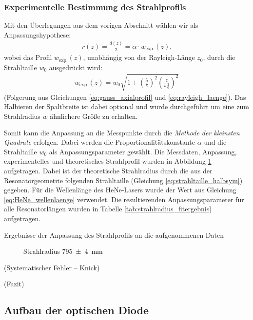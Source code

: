 \documentclass[11pt, a4paper]{article}
\numberwithin{equation}{section}
\begin{document}
\subsubsection{Experimentelle Bestimmung des Strahlprofils}
Mit den Überlegungen aus dem vorigen Abschnitt wählen wir als Anpassungshypothese:
\begin{align}
	 r(z) = \frac{d(z)}{2} = \alpha \cdot w_\mathrm{exp.}(z) \text{,}
\end{align}
wobei das Profil $w_\mathrm{exp.}(z)$, unabhängig von der Rayleigh-Länge $z_0$, durch die Strahltaille $w_0$ ausgedrückt wird:
\begin{align}
	w_\mathrm{exp.}(z) = w_0 \sqrt{1 + \left( \frac{\lambda}{\pi} \right)^2 \left( \frac{z}{w_0^2}\right)^2}
\end{align}
(Folgerung aus Gleichungen \ref{eq:gauss_axialprofil} und \ref{eq:rayleigh_laenge}).
Das Halbieren der Spaltbreite ist dabei optional und wurde durchgeführt um eine zum Strahlradius $w$ ähnlichere Größe zu erhalten.

Somit kann die Anpassung an die Messpunkte durch die \emph{Methode der kleinsten Quadrate} erfolgen.
Dabei werden die Proportionalitätskonstante $\alpha$ und die Strahltaille $w_0$ als Anpassungsparameter gewählt.
Die Messdaten, Anpassung, experimentelles und theoretisches Strahlprofil wurden in Abbildung \ref{fig:ex_strahlradius} aufgetragen.
Dabei ist der theoretische Strahlradius durch die aus der Resonatorgeometrie folgenden Strahltaille (Gleichung \ref{eq:strahltaille_halbsym}) gegeben.
Für die Wellenlänge des HeNe-Lasers wurde der Wert aus Gleichung \ref{eq:HeNe_wellenlaenge} verwendet.
Die resultierenden Anpassungsparameter für alle Resonatorlängen wurden in Tabelle \ref{tab:strahlradius_fitergebnis} aufgetragen.
\begin{table}[h]
	\centering
	
	\caption{Ergebnisse der Anpassung des Strahlprofils an die aufgenommenen Daten}
	\label{tab:strahlradius_fitergebnis}
\end{table}
\begin{figure}[h]
	\centering
	
	\caption{Strahlradius \SI{795 +- 4}{\milli\metre}}
	\label{fig:ex_strahlradius}
\end{figure}

(Systematischer Fehler -- Knick)

(Fazit)


\subsection{Aufbau der optischen Diode}
\end{document}
